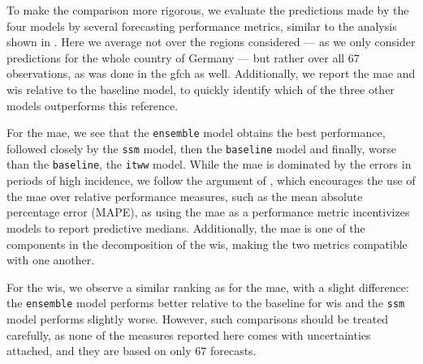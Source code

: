 To make the comparison more rigorous, we evaluate the predictions made by the four models by several forecasting performance metrics, similar to the analysis shown in . Here we average not over the regions considered --- as we only consider predictions for the whole country of Germany --- but rather over all $67$ observations, as was done in the \gls{gfch} as well.
Additionally, we report the \gls{mae} and \gls{wis} relative to the baseline model, to quickly identify which of the three other models outperforms this reference.

\begin{table}
    \centering
    
    \caption{Quantitative comparison of the four approaches to one-week ahead forecasts. All metrics are averaged across the $67$ one-week ahead forecasts made by each model. To be consistent with the \gls{wis} we use the median as the point forecast for the \gls{mae}. For the \gls{wis} we show, additionally, the decomposition into four components, as well as for both MAE and WIS the relative performance, when compared to the \texttt{baseline}, of the \texttt{ensemble}, \texttt{itww} and \texttt{ssm}. }
    \label{tab:regional_forecasts_combined_metrics}
\end{table}

For the \gls{mae}, we see that the \texttt{ensemble} model obtains the best performance, followed closely by the \texttt{ssm} model, then the \texttt{baseline} model and finally, worse than the \texttt{baseline}, the \texttt{itww} model. While the \gls{mae} is dominated by the errors in periods of high incidence, we follow the argument of \citep[Section 5]{Bracher2021Evaluating}, which encourages the use of the \gls{mae} over relative performance measures, such as the mean absolute percentage error (MAPE), as using the \gls{mae} as a performance metric incentivizes models to report predictive medians. 
Additionally, the \gls{mae} is one of the components in the decomposition of the \gls{wis}, making the two metrics compatible with one another. 

For the \gls{wis}, we observe a similar ranking as for the \gls{mae}, with a slight difference: the \texttt{ensemble} model performs better relative to the baseline for \gls{wis} and the \texttt{ssm} model performs slightly worse. However, such comparisons should be treated carefully, as none of the measures reported here comes with uncertainties attached, and they are based on only $67$ forecasts. 

